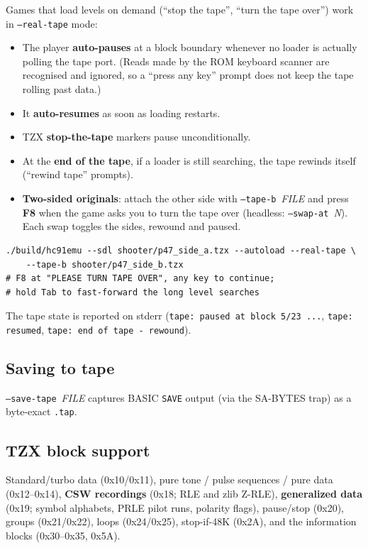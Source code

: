 \documentclass[11pt,a4paper]{article}
\newcommand{\opt}[1]{\texttt{#1}}
\newcommand{\key}[1]{\textsf{\textbf{#1}}}
\begin{document}
Games that load levels on demand (``stop the tape'', ``turn the tape
over'') work in \opt{--real-tape} mode:

\begin{itemize}
\item The player \textbf{auto-pauses} at a block boundary whenever no
loader is actually polling the tape port. (Reads made by the ROM
keyboard scanner are recognised and ignored, so a ``press any key''
prompt does not keep the tape rolling past data.)
\item It \textbf{auto-resumes} as soon as loading restarts.
\item TZX \textbf{stop-the-tape} markers pause unconditionally.
\item At the \textbf{end of the tape}, if a loader is still searching,
the tape rewinds itself (``rewind tape'' prompts).
\item \textbf{Two-sided originals}: attach the other side with
\opt{--tape-b}~\textit{FILE} and press \key{F8} when the game asks you
to turn the tape over (headless: \opt{--swap-at}~\textit{N}). Each
swap toggles the sides, rewound and paused.
\end{itemize}

\begin{Verbatim}
./build/hc91emu --sdl shooter/p47_side_a.tzx --autoload --real-tape \
    --tape-b shooter/p47_side_b.tzx
# F8 at "PLEASE TURN TAPE OVER", any key to continue;
# hold Tab to fast-forward the long level searches
\end{Verbatim}

The tape state is reported on stderr (\texttt{tape: paused at block
5/23 ...}, \texttt{tape: resumed}, \texttt{tape: end of tape -
rewound}).

\subsection{Saving to tape}

\opt{--save-tape}~\textit{FILE} captures BASIC \texttt{SAVE} output
(via the SA-BYTES trap) as a byte-exact \texttt{.tap}.

\subsection{TZX block support}

Standard/turbo data (0x10/0x11), pure tone / pulse sequences / pure
data (0x12--0x14), \textbf{CSW recordings} (0x18; RLE and zlib Z-RLE),
\textbf{generalized data} (0x19; symbol alphabets, PRLE pilot runs,
polarity flags), pause/stop (0x20), groups (0x21/0x22), loops
(0x24/0x25), stop-if-48K (0x2A), and the information blocks
(0x30--0x35, 0x5A).
\end{document}
